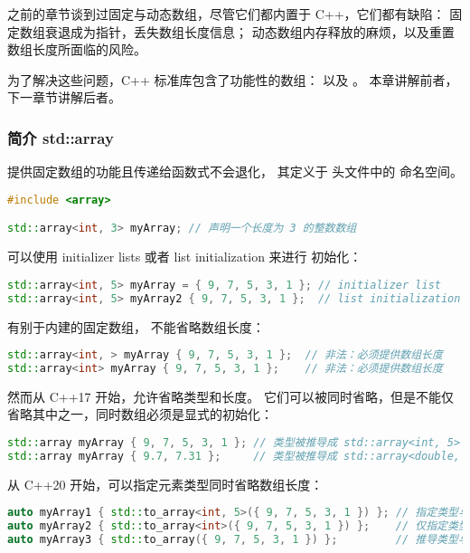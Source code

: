 \documentclass[../../LearnCpp.tex]{subfiles}
\begin{document}

之前的章节谈到过固定与动态数组，尽管它们都内置于 C++，它们都有缺陷：
固定数组衰退成为指针，丢失数组长度信息；
动态数组内存释放的麻烦，以及重置数组长度所面临的风险。

为了解决这些问题，C++ 标准库包含了功能性的数组：
 以及 。
本章讲解前者，下一章节讲解后者。

\subsubsection*{简介 std::array}

 提供固定数组的功能且传递给函数式不会退化，
其定义于  头文件中的  命名空间。

\begin{lstlisting}[language=C++]
#include <array>

std::array<int, 3> myArray; // 声明一个长度为 3 的整数数组
\end{lstlisting}

可以使用 initializer lists 或者 list initialization 来进行  初始化：

\begin{lstlisting}[language=C++]
std::array<int, 5> myArray = { 9, 7, 5, 3, 1 }; // initializer list
std::array<int, 5> myArray2 { 9, 7, 5, 3, 1 };  // list initialization
\end{lstlisting}

有别于内建的固定数组， 不能省略数组长度：

\begin{lstlisting}[language=C++]
std::array<int, > myArray { 9, 7, 5, 3, 1 };  // 非法：必须提供数组长度
std::array<int> myArray { 9, 7, 5, 3, 1 };    // 非法：必须提供数组长度
\end{lstlisting}

然而从 C++17 开始，允许省略类型和长度。
它们可以被同时省略，但是不能仅省略其中之一，同时数组必须是显式的初始化：

\begin{lstlisting}[language=C++]
std::array myArray { 9, 7, 5, 3, 1 }; // 类型被推导成 std::array<int, 5>
std::array myArray { 9.7, 7.31 };     // 类型被推导成 std::array<double, 2>
\end{lstlisting}

从 C++20 开始，可以指定元素类型同时省略数组长度：

\begin{lstlisting}[language=C++]
auto myArray1 { std::to_array<int, 5>({ 9, 7, 5, 3, 1 }) }; // 指定类型与长度
auto myArray2 { std::to_array<int>({ 9, 7, 5, 3, 1 }) };    // 仅指定类型，推导长度
auto myArray3 { std::to_array({ 9, 7, 5, 3, 1 }) };         // 推导类型与长度
\end{lstlisting}
\end{document}
